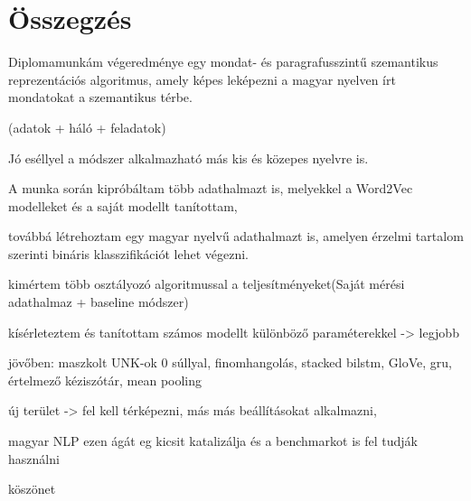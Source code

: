 \chapter{Összegzés} %
\label{ch:sum}

Diplomamunkám végeredménye egy mondat- és paragrafusszintű szemantikus reprezentációs algoritmus, amely képes leképezni a magyar nyelven írt mondatokat a szemantikus térbe.
 
(adatok + háló + feladatok)

Jó eséllyel a módszer alkalmazható más kis és közepes nyelvre is.



A munka során kipróbáltam több adathalmazt is, melyekkel a Word2Vec modelleket és a saját modellt tanítottam,

 továbbá létrehoztam egy magyar nyelvű adathalmazt is, amelyen érzelmi tartalom szerinti bináris klasszifikációt lehet végezni.
 
 kimértem több osztályozó algoritmussal a teljesítményeket(Saját mérési adathalmaz + baseline módszer)








kísérleteztem és tanítottam számos modellt különböző paraméterekkel -> legjobb


jövőben: maszkolt UNK-ok 0 súllyal, finomhangolás, stacked bilstm, GloVe, gru,  értelmező kéziszótár, mean pooling

új terület -> fel kell térképezni, más más beállításokat alkalmazni, 

magyar NLP ezen ágát eg kicsit katalizálja és a benchmarkot is fel tudják használni

köszönet
